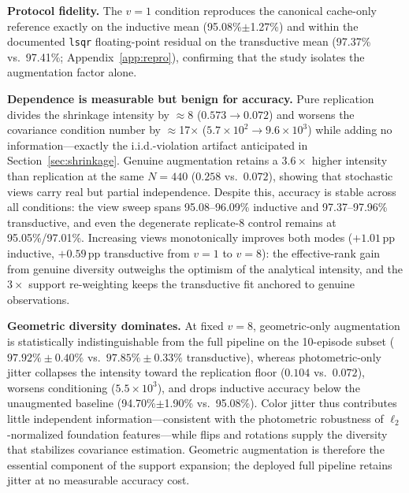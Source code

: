 \documentclass[preprint,12pt]{elsarticle}
\begin{document}
\textbf{Protocol fidelity.} The $v=1$ condition reproduces the canonical cache-only reference exactly on the inductive mean (95.08\%$\pm$1.27\%) and within the documented \texttt{lsqr} floating-point residual on the transductive mean (97.37\% vs.\ 97.41\%; Appendix~\ref{app:repro}), confirming that the study isolates the augmentation factor alone.

\textbf{Dependence is measurable but benign for accuracy.} Pure replication divides the shrinkage intensity by $\approx$8 ($0.573\to0.072$) and worsens the covariance condition number by $\approx$17$\times$ ($5.7\times10^{2}\to9.6\times10^{3}$) while adding no information---exactly the i.i.d.-violation artifact anticipated in Section~\ref{sec:shrinkage}. Genuine augmentation retains a $3.6\times$ higher intensity than replication at the same $N=440$ ($0.258$ vs.\ $0.072$), showing that stochastic views carry real but partial independence. Despite this, accuracy is stable across all conditions: the view sweep spans 95.08--96.09\% inductive and 97.37--97.96\% transductive, and even the degenerate replicate-8 control remains at 95.05\%/97.01\%. Increasing views monotonically improves both modes ($+1.01$\,pp inductive, $+0.59$\,pp transductive from $v=1$ to $v=8$): the effective-rank gain from genuine diversity outweighs the optimism of the analytical intensity, and the $3\times$ support re-weighting keeps the transductive fit anchored to genuine observations.

\textbf{Geometric diversity dominates.} At fixed $v=8$, geometric-only augmentation is statistically indistinguishable from the full pipeline on the 10-episode subset ($97.92\% \pm 0.40\%$ vs.\ $97.85\% \pm 0.33\%$ transductive), whereas photometric-only jitter collapses the intensity toward the replication floor ($0.104$ vs.\ $0.072$), worsens conditioning ($5.5\times10^{3}$), and drops inductive accuracy below the unaugmented baseline (94.70\%$\pm$1.90\% vs.\ 95.08\%). Color jitter thus contributes little independent information---consistent with the photometric robustness of $\ell_2$-normalized foundation features---while flips and rotations supply the diversity that stabilizes covariance estimation. Geometric augmentation is therefore the essential component of the support expansion; the deployed full pipeline retains jitter at no measurable accuracy cost.
\end{document}
